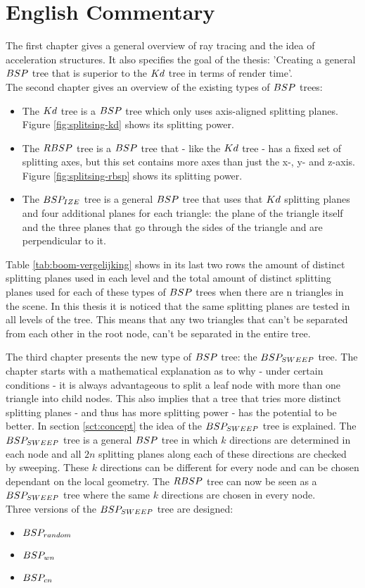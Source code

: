 \chapter{English Commentary}

The first chapter gives a general overview of ray tracing and the idea of acceleration structures.
It also specifies the goal of the thesis: 'Creating a general $BSP$ tree that is superior to the $Kd$ tree in terms of render time'.\\

The second chapter gives an overview of the existing types of $BSP$ trees:
\begin{itemize}
  \item The $Kd$ tree is a $BSP$ tree which only uses axis-aligned splitting planes. Figure \ref{fig:splitsing-kd} shows its splitting power.
  \item The $RBSP$ tree is a $BSP$ tree that - like the $Kd$ tree - has a fixed set of splitting axes, but this set contains more axes than just the x-, y- and z-axis. Figure \ref{fig:splitsing-rbsp} shows its splitting power.
  \item The $BSP_{IZE}$ tree is a general $BSP$ tree that uses that $Kd$ splitting planes and four additional planes for each triangle: the plane of the triangle itself and the three planes that go through the sides of the triangle and are perpendicular to it.  
\end{itemize}

Table \ref{tab:boom-vergelijking} shows in its last two rows the amount of distinct splitting planes used in each level and the total amount of distinct splitting planes used for each of these types of $BSP$ trees when there are n triangles in the scene.
In this thesis it is noticed that the same splitting planes are tested in all levels of the tree.
This means that any two triangles that can't be separated from each other in the root node, can't be separated in the entire tree.

The third chapter presents the new type of $BSP$ tree: the $BSP_{SWEEP}$ tree.
The chapter starts with a mathematical explanation as to why - under certain conditions - it is always advantageous to split a leaf node with more than one triangle into child nodes.
This also implies that a tree that tries more distinct splitting planes - and thus has more splitting power - has the potential to be better.
In section \ref{sct:concept} the idea of the $BSP_{SWEEP}$ tree is explained.
The $BSP_{SWEEP}$ tree is a general $BSP$ tree in which $k$ directions are determined in each node and all $2n$ splitting planes along each of these directions are checked by sweeping. 
These $k$ directions can be different for every node and can be chosen dependant on the local geometry.
The $RBSP$ tree can now be seen as a $BSP_{SWEEP}$ tree where the same $k$ directions are chosen in every node.\\

Three versions of the $BSP_{SWEEP}$ tree are designed:
\begin{itemize}
  \item $BSP_{random}$ %
  \item $BSP_{wn}$ 
  \item $BSP_{cn}$
\end{itemize}

